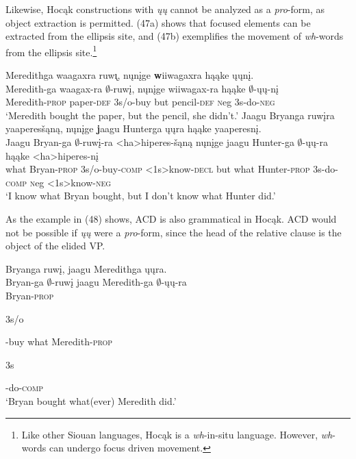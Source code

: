 \documentclass[output=paper]{LSP/langsci}
\begin{document}
Likewise, Hoc\k{a}k constructions with \emph{\k{u}\k{u}} cannot be analyzed as a \emph{pro}-form, as object extraction is permitted. (47a) shows that focused elements can be extracted from the ellipsis site, and (47b) exemplifies the movement of \emph{wh}-words from the ellipsis site.\footnote{Like other Siouan languages, Hoc\k{a}k is a \emph{wh}-in-situ language. However, \emph{wh}-words can undergo focus driven movement.}

\begin{exe}
\ex
\begin{xlist}
\ex
\glll Meredithga waagaxra ruw\k{\i}, n\k{u}n\k{i}ge {\textbf wiiwagaxra} h\k{a}\k{a}ke \k{u}\k{u}n\k{i}.\\
Meredith-ga waagax-ra $\emptyset$-ruw\k{i}, n\k{u}n\k{i}ge wiiwagax-ra h\k{a}\k{a}ke $\emptyset$-\k{u}\k{u}-n\k{i}\\
Meredith-\textsc{prop} paper-\textsc{def} {\textsc 3s/o}-buy but pencil-\textsc{def} {\textsc neg} {\textsc 3s}-do-\textsc{neg}\\
\trans `Meredith bought the paper, but the pencil, she didn't.'
\ex
\glll Jaagu Bryanga ruw\k{i}ra yaaperes\v{s}\k{a}n\k{a}, n\k{u}n\k{i}ge {\textbf jaagu} Hunterga \k{u}\k{u}ra h\k{a}\k{a}ke yaaperesn\k{i}.\\
Jaagu Bryan-ga $\emptyset$-ruw\k{i}-ra <ha>hiperes-\v{s}\k{a}n\k{a} n\k{u}n\k{i}ge jaagu Hunter-ga $\emptyset$-\k{u}\k{u}-ra h\k{a}\k{a}ke <ha>hiperes-n\k{i}\\
what Bryan-\textsc{prop} {\textsc 3s/o}-buy-\textsc{comp} <{\textsc 1s}>know-\textsc{decl} but what Hunter-\textsc{prop} {\textsc 3s}-do-\textsc{comp} {\textsc neg} <{\textsc 1s}>know-\textsc{neg}\\
\trans `I know what Bryan bought, but I don't know what Hunter did.'
\end{xlist}
\end{exe}

As the example in (48) shows, ACD is also grammatical in Hoc\k{a}k. ACD would not be possible if \emph{\k{u}\k{u}} were a \emph{pro}-form, since the head of the relative clause is the object of the elided VP.

\begin{exe}
\ex
\glll Bryanga ruw\k{i}, jaagu Meredithga \k{u}\k{u}ra.\\
Bryan-ga $\emptyset$-ruw\k{i} jaagu Meredith-ga $\emptyset$-\k{u}\k{u}-ra\\
Bryan-\textsc{prop} \begin{sc}3s/o\end{sc}-buy what Meredith-\textsc{prop} \begin{sc}3s\end{sc}-do-\textsc{comp}\\
\trans `Bryan bought what(ever) Meredith did.'
\end{exe}
\end{document}
